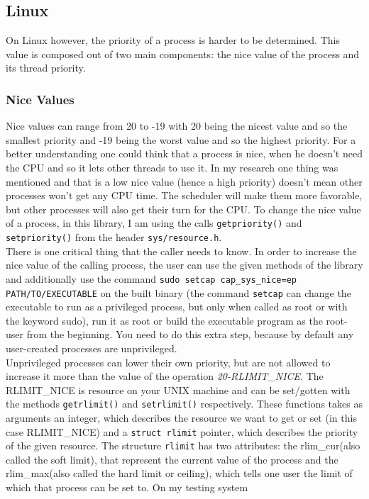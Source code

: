\subsection{Linux}
On Linux however, the priority of a process is harder to be determined. This value is composed out of two main components: the nice value of the process and its thread priority.
\subsubsection{Nice Values}
Nice values can range from 20 to
-19 with 20 being the nicest value and so the smallest priority and -19 being the worst value and so
the highest priority. For a better understanding one could think that a process is nice, when he doesn't need
the CPU and so it lets other threads to use it. In my research one thing was mentioned and that is a low nice value (hence a high priority) doesn't mean other processes won't get any CPU
time. The scheduler will make them more favorable, but other processes will also get their turn for the
CPU.
To change the nice value of a process, in this library, I am using
the calls \texttt{getpriority()} and \texttt{setpriority()} from the header \texttt{sys/resource.h}.\\
There is one
critical thing that the caller needs to know. In order to increase the nice value of the calling
process, the user can use the given methods of the library and additionally use the command
\texttt{sudo setcap cap\_sys\_nice=ep PATH/TO/EXECUTABLE} on the built binary (the command \texttt{setcap} can change the executable to
run as a privileged process, but only when called as root or with the keyword sudo), run it as root or build the executable
program as the root-user from the beginning. You need to do this extra step,
because by default any user-created processes are unprivileged.\\
Unprivileged processes can lower their own
priority, but are not allowed to increase it more than the value of the operation
\textit{20-RLIMIT\_NICE}. The RLIMIT\_NICE is resource on your UNIX machine and can be set/gotten with the methods \texttt{getrlimit()} and \texttt{setrlimit()} respectively. These functions takes as arguments an integer, which describes the resource we want to get or set (in this case RLIMIT\_NICE) and a \texttt{struct rlimit} pointer, which describes the priority of the given resource. The structure \texttt{rlimit} has two attributes: the \dq rlim\_cur\dq{}(also called the soft limit), that represent the current value of the process and the \dq rlim\_max\dq{}(also called the hard limit or ceiling), which tells one user the limit of which that process can be set to. On my testing system
